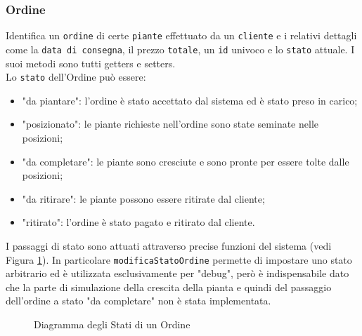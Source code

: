 \documentclass{article}
\newcommand{\code}[1]{\texttt{#1}}
\begin{document}
\subsubsection{Ordine}
    Identifica un \code{ordine} di certe \code{piante} effettuato da un \code{cliente} e i relativi dettagli come la \code{data di consegna}, il prezzo \code{totale}, un \code{id} univoco e lo \code{stato} attuale.
    I suoi metodi sono tutti getters e setters.\\
    Lo \code{stato} dell'Ordine può essere:
    \begin{itemize}
        \item "da piantare": l'ordine è stato accettato dal sistema ed è stato preso in carico;
        \item "posizionato": le piante richieste nell'ordine sono state seminate nelle posizioni;
        \item "da completare": le piante sono cresciute e sono pronte per essere tolte dalle posizioni;
        \item "da ritirare": le piante possono essere ritirate dal cliente;
        \item "ritirato": l'ordine è stato pagato e ritirato dal cliente.
    \end{itemize}
    I passaggi di stato sono attuati attraverso precise funzioni del sistema (vedi Figura \ref{fig:diagram_statiordine}). In particolare \code{modificaStatoOrdine} permette di impostare uno stato arbitrario ed è utilizzata esclusivamente per "debug", però è indispensabile dato che la parte di simulazione della crescita della pianta e quindi del passaggio dell'ordine a stato "da completare" non è stata implementata.

    \begin{figure}[H]
        \centering
        \caption{Diagramma degli Stati di un Ordine}
        \label{fig:diagram_statiordine}
    \end{figure}
\end{document}
